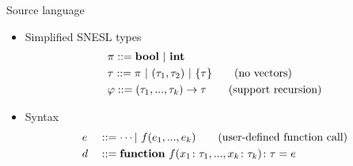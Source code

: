 \documentclass{beamer}
\begin{document}
\begin{frame}{Source language}

\begin{itemize}
\item Simplified SNESL types
	{\small\begin{align*} 
	& \pi ::= \mathbf{bool} \ | \ \mathbf{int}  \\ 
	& \tau ::= \pi \ | \ (\tau_1,\tau_2) \ | \ \{\tau\} \tag{no vectors} \\
	& \varphi :: = (\tau_1,...,\tau_k) \rightarrow \tau  \tag{support recursion}
	\end{align*}}	
\pause
\item Syntax
	{\small \begin{alignat*}{2} 
	& e &&::= \cdots | \ f (e_1,...,e_k)  \tag {user-defined function call} \\
	& d &&::= \mathbf{function} \  f (x_1\colon{\tau_1}, ..., x_k\colon\tau_k)\colon{\tau} = e \\
	\end{alignat*}
   }
\end{itemize}
\end{frame}
\end{document}
